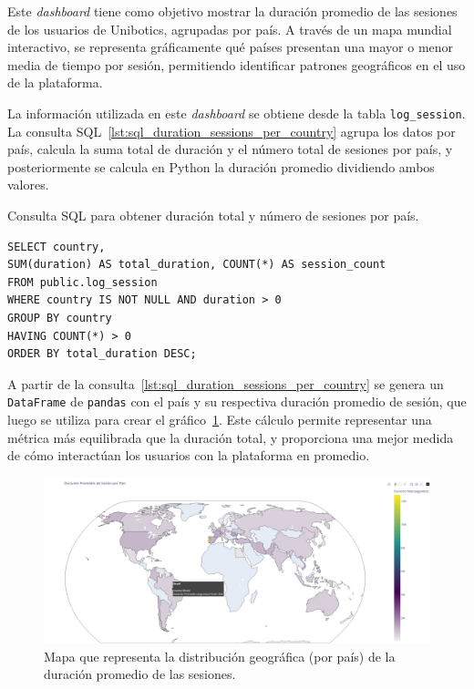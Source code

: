 \documentclass[a4paper, 12pt]{book}
\begin{document}
Este \textit{dashboard} tiene como objetivo mostrar la duración promedio de las sesiones de los usuarios de Unibotics, agrupadas por país. A través de un mapa mundial interactivo, se representa gráficamente qué países presentan una mayor o menor media de tiempo por sesión, permitiendo identificar patrones geográficos en el uso de la plataforma.

La información utilizada en este \textit{dashboard} se obtiene desde la tabla \texttt{log\_session}. La consulta SQL~\ref{lst:sql_duration_sessions_per_country} agrupa los datos por país, calcula la suma total de duración y el número total de sesiones por país, y posteriormente se calcula en Python la duración promedio dividiendo ambos valores.

\begin{listing}[h!]
\caption{Consulta SQL para obtener duración total y número de sesiones por país.}
\label{lst:sql_duration_sessions_per_country}
\begin{verbatim}
SELECT country, 
SUM(duration) AS total_duration, COUNT(*) AS session_count 
FROM public.log_session
WHERE country IS NOT NULL AND duration > 0
GROUP BY country
HAVING COUNT(*) > 0  
ORDER BY total_duration DESC;
\end{verbatim}
\end{listing}

A partir de la consulta~\ref{lst:sql_duration_sessions_per_country} se genera un \texttt{DataFrame} de \texttt{pandas} con el país y su respectiva duración promedio de sesión, que luego se utiliza para crear el gráfico~\ref{fig:1c}. Este cálculo permite representar una métrica más equilibrada que la duración total, y proporciona una mejor medida de cómo interactúan los usuarios con la plataforma en promedio.

\begin{figure}[H]
  \centering
  \includegraphics[width=1.1\textwidth]{img/1c.png}
  \caption{Mapa que representa la distribución geográfica (por país) de la duración promedio de las sesiones.}
  \label{fig:1c}
\end{figure}
\end{document}
